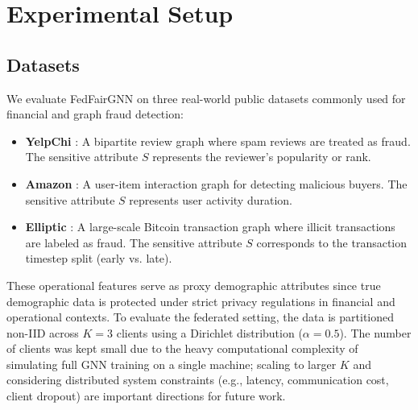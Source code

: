 \section{Experimental Setup} \label{sec:experiments}
\subsection{Datasets}
We evaluate FedFairGNN on three real-world public datasets commonly used for financial and graph fraud detection:
\begin{itemize}
    \item \textbf{YelpChi} \cite{rayana2015collective}: A bipartite review graph where spam reviews are treated as fraud. The sensitive attribute $S$ represents the reviewer's popularity or rank.
    \item \textbf{Amazon} \cite{mcauley2013amateurs}: A user-item interaction graph for detecting malicious buyers. The sensitive attribute $S$ represents user activity duration.
    \item \textbf{Elliptic} \cite{weber2019anti}: A large-scale Bitcoin transaction graph where illicit transactions are labeled as fraud. The sensitive attribute $S$ corresponds to the transaction timestep split (early vs. late).
\end{itemize}
These operational features serve as proxy demographic attributes since true demographic data is protected under strict privacy regulations in financial and operational contexts. To evaluate the federated setting, the data is partitioned non-IID across $K=3$ clients using a Dirichlet distribution ($\alpha=0.5$). The number of clients was kept small due to the heavy computational complexity of simulating full GNN training on a single machine; scaling to larger $K$ and considering distributed system constraints (e.g., latency, communication cost, client dropout) are important directions for future work.

